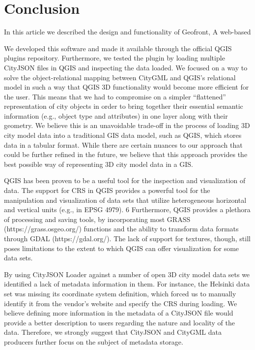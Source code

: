\chapter{Conclusion}

In this article we described the design and functionality of Geofront, A web-based 

We developed this software and made it available through the official QGIS plugins repository.
Furthermore, we tested the plugin by loading multiple CityJSON files in QGIS and inspecting the data loaded.
We focused on a way to solve the object-relational mapping between CityGML and QGIS’s relational model in such a way that QGIS 3D functionality would become more efficient for the user. This means that we had to compromise on a simpler “flattened” representation of city objects in order to bring together their essential semantic information (e.g., object type and attributes) in one layer along with their geometry. 
We believe this is an unavoidable trade-off in the process of loading 3D city model data into a traditional GIS data model, such as QGIS, which stores data in a tabular format. 
While there are certain nuances to our approach that could be further refined in the future, we believe that this approach provides the best possible way of representing 3D city model
data in a GIS.

QGIS has been proven to be a useful tool for the inspection and visualization of data. 
The support for CRS in QGIS provides a powerful tool for the manipulation and visualization of data sets that utilize heterogeneous horizontal and vertical units (e.g., in EPSG 4979). 6
Furthermore, QGIS provides a plethora of processing and saving tools, by incorporating most GRASS (https://grass.osgeo.org/) functions and the ability to transform data formats
through GDAL (https://gdal.org/). 
The lack of support for textures, though, still poses limitations to the extent to which QGIS can offer visualization for some data sets.

By using CityJSON Loader against a number of open 3D city model data sets we identified a lack of metadata information in them. 
For instance, the Helsinki data set was missing its coordinate system definition, which forced us to manually identify it from the vendor’s website and specify the CRS during loading. 
We believe defining more information in the metadata of a CityJSON file would provide a better description to users regarding the nature and locality of the data. 
Therefore, we strongly suggest that CityJSON and CityGML data producers further focus on the subject of metadata storage.

